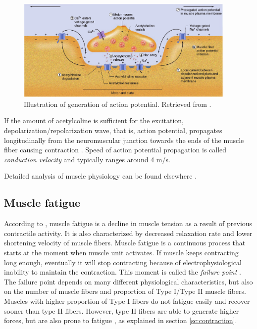 \begin{figure}[ht]
\centering
\includegraphics[width=0.95\textwidth]{Images/introduction/action_potential_generation.png}
\caption{Illustration of generation of action potential. Retrieved from \citet{Widmaier2014}.}
\label{fig:action_potential_generation}
\end{figure}
  
If the amount of acetylcoline is sufficient for the excitation, depolarization/repolarization wave, that is, action potential, propagates longitudinally from the neuromuscular junction towards the ends of the muscle fiber causing contraction \citep{Henneberg1999}. Speed of action potential propagation is called \emph{conduction velocity} and typically ranges around 4 m/s.

Detailed analysis of muscle physiology can be found elsewhere \citep{Squire1986, Widmaier2014}.



\subsection{Muscle fatigue} \label{sc:fatigue}

According to \citet{Widmaier2014}, muscle fatigue is a decline in muscle tension as a result of previous contractile activity. It is also characterized by decreased relaxation rate and lower shortening velocity of muscle fibers. Muscle fatigue is a continuous process that starts at the moment when muscle unit activates. If muscle keeps contracting long enough, eventually it will stop contracting because of electrophysiological inability to maintain the contraction. This moment is called the \emph{failure point} \citep{DeLuca1984}. The failure point depends on many different physiological characteristics, but also on the number of muscle fibers and proportion of Type I/Type II muscle fibers. Muscles with higher proportion of Type I fibers do not fatigue easily and recover sooner than type II fibers. However, type II fibers are able to generate higher forces, but are also prone to fatigue \citep{Kupa1995}, as explained in section \ref{sc:contraction}.

